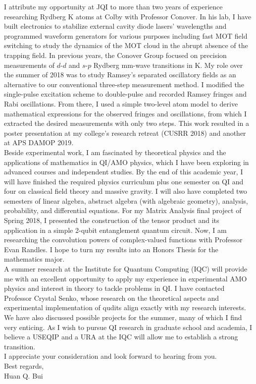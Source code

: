 \documentclass[10pt]{article}
\begin{document}
I attribute my opportunity at JQI to more than two years of experience researching Rydberg K atoms at Colby with Professor  Conover. In his lab, I have built electronics to stabilize external cavity diode lasers' wavelengths and programmed waveform generators for various purposes including fast MOT field switching to study the dynamics of the MOT cloud in the abrupt absence of the trapping field. In previous years, the Conover Group focused on precision measurements of $d$-$d$ and $s$-$p$ Rydberg mm-wave transitions in K. My role over the summer of 2018 was to study Ramsey's separated oscillatory fields as an alternative to our conventional three-step measurement method. I modified the single-pulse excitation scheme to double-pulse and recorded Ramsey fringes and Rabi oscillations. From there, I used a simple two-level atom model to derive mathematical expressions for the observed fringes and oscillations, from which I extracted the desired measurements with only two steps. This work resulted in a poster presentation at my college's research retreat (CUSRR 2018) and another at APS DAMOP 2019.  \\


Beside experimental work, I am fascinated by theoretical physics and the applications of mathematics in QI/AMO physics, which I have been exploring in advanced courses and independent studies. By the end of this academic year, I will have finished the required physics curriculum plus one semester on QI and four on classical field theory and massive gravity. I will also have completed two semesters of linear algebra, abstract algebra (with algebraic geometry), analysis, probability, and differential equations. For my Matrix Analysis final project of Spring 2018, I presented the construction of the tensor product and its application in a simple 2-qubit entanglement quantum circuit. Now, I am researching the convolution powers of complex-valued functions with Professor Evan Randles. I hope to turn my results into an Honors Thesis for the mathematics major. \\

  
A summer research at the Institute for Quantum Computing (IQC) will provide me with an excellent opportunity to apply my experience in experimental AMO physics and interest in theory to tackle problems in QI. I have contacted Professor Crystal Senko, whose research on the theoretical aspects and experimental implementation of qudits align exactly with my research interests. We have also discussed possible projects for the summer, many of which I find very enticing. As I wish to pursue QI research in graduate school and academia, I believe a USEQIP and a URA at the IQC will allow me to establish a strong transition.\\

\noindent I appreciate your consideration and look forward to hearing from you. \\



\noindent Best regards,\\
\noindent Huan Q. Bui




















	
	
	
	
	
\end{document}
